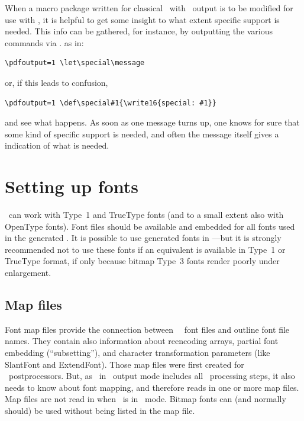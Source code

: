 \documentclass{pdftexmanual}
\begin{document}
When a macro package written for classical \TEX\ with \DVI\ output is to
be modified for use with \PDFTEX, it is helpful to get some insight to
what extent \PDFTEX\hyph specific support is needed. This info can be
gathered, for instance, by outputting the various  commands
via . as in:

\begin{verbatim}
\pdfoutput=1 \let\special\message
\end{verbatim}

or, if this leads to confusion,

\begin{verbatim}
\pdfoutput=1 \def\special#1{\write16{special: #1}}
\end{verbatim}

and see what happens. As soon as one  message turns up,
one knows for sure that some kind of \PDFTEX\hyph specific support is
needed, and often the message itself gives a indication of what is
needed.

\chapter{Setting up fonts}

\PDFTEX\ can work with Type~1 and TrueType fonts (and to a small extent
also with OpenType fonts). Font files should be available and embedded
for all fonts used in the generated \PDF. It is possible to use
\METAFONT\hyph generated fonts in \PDFTEX---but it is strongly
recommended not to use these fonts if an equivalent is available in
Type~1 or TrueType format, if only because bitmap Type~3 fonts render
poorly under enlargement.

\section{Map files}
\label{sec.mapfile}

Font map files provide the connection between \TEX\ \TFM\ font files
and outline font file names. They contain also information about
re\hyph encoding arrays, partial font embedding (``subsetting''), and
character transformation parameters (like SlantFont and ExtendFont). Those
map files were first created for \DVI\ postprocessors. But, as \PDFTEX\
in \PDF\ output mode includes all \PDF\ processing steps, it also needs
to know about font mapping, and therefore reads in one or more map files.
Map files are not read in when \PDFTEX\ is in \DVI\ mode. Bitmap fonts
can (and normally should) be used without being listed in the map file.
\end{document}
